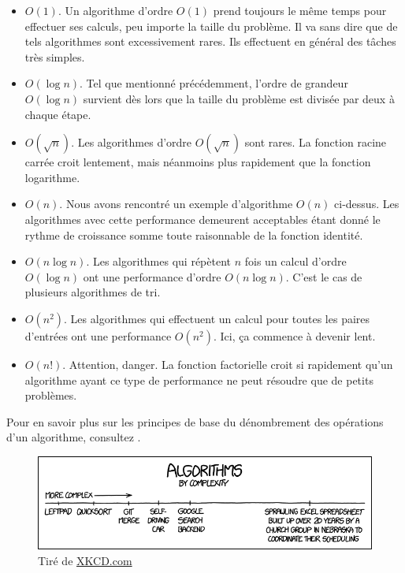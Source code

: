 \begin{itemize}
\item $O(1)$. Un algorithme d'ordre $O(1)$ prend toujours le même
  temps pour effectuer ses calculs, peu importe la taille du problème.
  Il va sans dire que de tels algorithmes sont excessivement rares. Ils
  effectuent en général des tâches très simples.
\item $O(\log n)$. Tel que mentionné précédemment, l'ordre de grandeur
  $O(\log n)$ survient dès lors que la taille du problème est divisée
  par deux à chaque étape.
\item $O(\sqrt{n})$. Les algorithmes d'ordre $O(\sqrt{n})$ sont rares.
  La fonction racine carrée croit lentement, mais néanmoins plus
  rapidement que la fonction logarithme.
\item $O(n)$. Nous avons rencontré un exemple d'algorithme $O(n)$
  ci-dessus. Les algorithmes avec cette performance demeurent
  acceptables étant donné le rythme de croissance somme toute
  raisonnable de la fonction identité.
\item $O(n \log n)$. Les algorithmes qui répètent $n$ fois un calcul
  d'ordre $O(\log n)$ ont une performance d'ordre $O(n \log n)$.
  C'est le cas de plusieurs algorithmes de tri.
\item $O(n^2)$. Les algorithmes qui effectuent un calcul pour toutes
  les paires d'entrées ont une performance $O(n^2)$. Ici, ça commence
  à devenir lent.
\item $O(n!)$. Attention, danger. La fonction factorielle croit si
  rapidement qu'un algorithme ayant ce type de performance ne peut
  résoudre que de petits problèmes.
\end{itemize}

Pour en savoir plus sur les principes de base du dénombrement des
opérations d'un algorithme, consultez
\citet[chapitre~1]{Stephens:algorithms:2013}.

\begin{figure}[t]
  \centering
  \begin{minipage}{0.9\linewidth}
    \includegraphics{images/algorithms} \\
    \footnotesize\sffamily%
    Tiré de \href{https://xkcd.com/927/}{XKCD.com}
  \end{minipage}
\end{figure}


